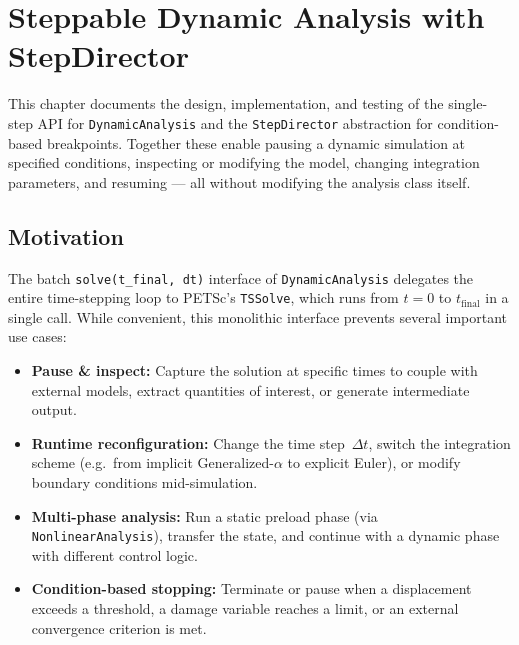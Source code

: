 
\chapter{Steppable Dynamic Analysis with StepDirector}
\label{ch:steppable-dynamic}

This chapter documents the design, implementation, and testing of the
single-step API for \texttt{DynamicAnalysis} and the \texttt{StepDirector}
abstraction for condition-based breakpoints.  Together these enable
pausing a dynamic simulation at specified conditions, inspecting or
modifying the model, changing integration parameters, and resuming ---
all without modifying the analysis class itself.

\section{Motivation}
\label{sec:sd-motivation}

The batch \texttt{solve(t\_final, dt)} interface of \texttt{DynamicAnalysis}
delegates the entire time-stepping loop to PETSc's \texttt{TSSolve}, which
runs from $t=0$ to $t_\text{final}$ in a single call.  While convenient,
this monolithic interface prevents several important use cases:

\begin{itemize}
  \item \textbf{Pause \& inspect:}  Capture the solution at specific times
        to couple with external models, extract quantities of interest,
        or generate intermediate output.
  \item \textbf{Runtime reconfiguration:}  Change the time step~$\Delta t$,
        switch the integration scheme (e.g.\ from implicit
        Generalized-$\alpha$ to explicit Euler), or modify boundary
        conditions mid-simulation.
  \item \textbf{Multi-phase analysis:}  Run a static preload phase
        (via \texttt{NonlinearAnalysis}), transfer the state, and
        continue with a dynamic phase with different control logic.
  \item \textbf{Condition-based stopping:}  Terminate or pause when
        a displacement exceeds a threshold, a damage variable reaches
        a limit, or an external convergence criterion is met.
\end{itemize}

